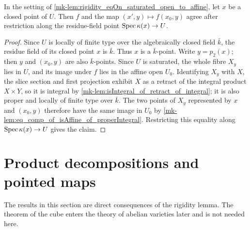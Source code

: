 \begin{lemma}
  \label{mk-lem:rigidity_eqAt_closedPoint_of_proper_into_affine}
  \leanok

  In the setting of
  \ref{mk-lem:rigidity_eqOn_saturated_open_to_affine}, let \(x\) be a closed point of
  \(U\).  Then \(f\) and the map \((x',y)\mapsto f(x_0,y)\) agree after restriction
  along the residue-field point \(\operatorname{Spec}\kappa(x)\to U\).
\end{lemma}
\begin{proof}
  \leanok
  Since \(U\) is locally of finite type over the algebraically closed field \(\bar k\),
  the residue field of its closed point \(x\) is \(\bar k\).  Thus \(x\) is a
  \(\bar k\)-point.  Write \(y=p_2(x)\); then \(y\) and \((x_0,y)\) are also
  \(\bar k\)-points.  Since \(U\) is saturated, the whole fibre \(X_y\) lies in
  \(U\), and its image under \(f\) lies in the affine open \(U_0\).  Identifying
  \(X_y\) with \(X\), the slice section and first projection exhibit \(X\) as a
  retract of the integral product \(X\times Y\), so it is integral by
  \ref{mk-lem:isIntegral_of_retract_of_integral}; it is also proper and locally of
  finite type over \(\bar k\).  The two points of \(X_y\) represented by \(x\) and
  \((x_0,y)\) therefore have the same image in \(U_0\) by
  \ref{mk-lem:eq_comp_of_isAffine_of_properIntegral}.  Restricting this equality along
  \(\operatorname{Spec}\kappa(x)\to U\) gives the claim.
\end{proof}

\section{Product decompositions and pointed maps}

\begin{remark}
  \label{mk-rmk:cube_not_needed}
  The results in this section are direct consequences of the rigidity lemma.  The theorem
  of the cube enters the theory of abelian varieties later and is not needed here.
\end{remark}

